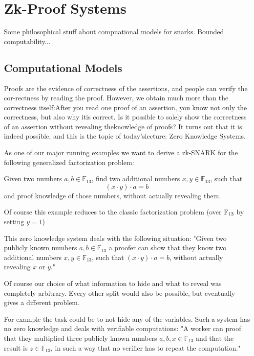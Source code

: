 \chapter{Zk-Proof Systems}

Some philosophical stuff about compuational models for snarks. Bounded computability...


\section{Computational Models}
Proofs are the evidence of correctness of the assertions, and people can verify the cor-rectness by reading the proof. However, we obtain much more than the correctness itself:After you read one proof of an assertion, you know not only the correctness, but also why itis correct. Is it possible to solely show the correctness of an assertion without revealing theknowledge of proofs? It turns out that it is indeed possible, and this is the topic of today’slecture: Zero Knowledge Systems.

\begin{example}
\label{main_example_2_1}
As one of our major running examples we want to derive a zk-SNARK for the following generalized factorization problem: 

Given two numbers $a,b\in \mathbb{F}_{13}$, find two additional numbers $x,y\in \mathbb{F}_{13}$, such that
$$
(x\cdot y) \cdot a = b 
$$
and proof knowledge of those numbers, without actually revealing them.

Of course this example reduces to the classic factorization problem (over $\mathbb{F}_{13}$ by setting $y=1$)

This zero knowledge system deals with the following situation: "Given two publicly known numbers $a,b \in \mathbb{F}_{13}$ a proofer can show that they know two additional numbers $x,y\in \mathbb{F}_{13}$, such that $(x\cdot y) \cdot a = b$, without actually revealing $x$ or $y$." 

Of course our choice of what information to hide and what to reveal was completely arbitrary. Every other split would also be possible, but eventually gives a different problem. 

For example the task could be to not hide any of the variables.  Such 
a system has no zero knowledge and deals with verifiable computations: "A worker can proof that they multiplied three publicly known numbers $a,b,x \in \mathbb{F}_{13}$ and that the result is $z \in \mathbb{F}_{13}$, in such a way that no verifier has to repeat the computation."
\end{example}


